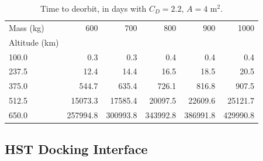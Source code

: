 \documentclass[paper=letter, fontsize=11pt]{scrartcl} %
\numberwithin{equation}{section} %
\numberwithin{figure}{section} %
\numberwithin{table}{section} %
\begin{document}
\begin{table}[H]
    \begin{center}
        \begin{tabular}{lrrrrr}
            \toprule
            Mass (kg)     & 600      & 700      & 800      & 900      & 1000     \\
            Altitude (km) &          &          &          &          &          \\
            \midrule
            100.0         & 0.3      & 0.3      & 0.4      & 0.4      & 0.4      \\
            237.5         & 12.4     & 14.4     & 16.5     & 18.5     & 20.5     \\
            375.0         & 544.7    & 635.4    & 726.1    & 816.8    & 907.5    \\
            512.5         & 15073.3  & 17585.4  & 20097.5  & 22609.6  & 25121.7  \\
            650.0         & 257994.8 & 300993.8 & 343992.8 & 386991.8 & 429990.8 \\
            \bottomrule
        \end{tabular}
    \end{center}
    \caption{Time to deorbit, in days with $C_D=2.2$, $A=4$ m$^2$.}
    \label{altitude_table}
\end{table}

\subsection{HST Docking Interface} \label{lids}
\end{document}
